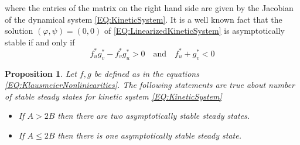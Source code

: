 \documentclass[12pt, a4paper]{article}
\theoremstyle{break}
\theoremstyle{break}
\newtheorem{prp}{Proposition}[section]
\theoremstyle{break}
\theoremstyle{break}
\theoremstyle{break}
\theoremstyle{break}
\theoremstyle{break}
\begin{document}
where the entries of the matrix on the right hand side are given by the Jacobian of the dynamical system \eqref{EQ:KineticSystem}. It is a well known fact that the solution $(\varphi, \psi) = (0, 0)$ of \eqref{EQ:LinearizedKineticSystem} is asymptotically stable if and only if
\begin{equation*}
    f_u^*g_v^* - f_v^*g_u^* > 0 \quad \text{and} \quad f_u^* + g_v^* < 0
\end{equation*}
\begin{prp}
    \label{prp:StabilityOfConstanstKineticSystem}
    Let $f, g$ be defined as in the equations \eqref{EQ:KlausmeierNonliniearities}. The following statements are true about number of stable steady states for kinetic system \eqref{EQ:KineticSystem}
    \begin{itemize}
        \item If $A > 2B$ then there are two asymptotically stable steady states.
        \item If $A \leq 2B$ then there is one asymptotically stable steady state.
    \end{itemize}
\end{prp}
\end{document}
